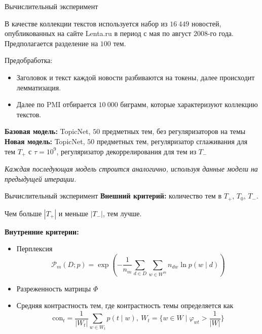 \documentclass{beamer}
\begin{document}
\begin{frame}{Вычислительный эксперимент}

В качестве коллекции текстов используется набор из $16 \ 449$ новостей, опубликованных на сайте Lenta.ru в период с мая по август $2008$-го года.
Предполагается разделение на $100$ тем. 

\begin{block}{Предобработка:}
\begin{itemize}
    \item Заголовок и текст каждой новости разбиваются на токены, далее происходит лемматизация.
    \item Далее по PMI отбирается $10 \ 000$ биграмм, которые характеризуют коллекцию текстов.
\end{itemize}
\end{block}

\textbf{Базовая модель:} TopicNet, $50$ предметных тем, без регуляризаторов на темы \\
\textbf{Новая модель:} TopicNet, $50$ предметных тем, регуляризатор сглаживания для тем $T_+$ с $\tau = {10}^{9}$, регуляризатор декоррелирования для тем из $T_-$

{\footnotesize \textit{Каждая последующая модель строится аналогично, используя данные модели на предыдущей итерации.}}

\end{frame}

\begin{frame}{Вычислительный эксперимент}
    \textbf{Внешний критерий:} количество тем в $T_+$, $T_0$, $T_-$.
    
    {\footnotesize Чем больше $|T_+|$ и меньше $|T_-|$, тем лучше.}

    \textbf{Внутренние критерии:}

    \begin{itemize}
        \item Перплексия
        $$\mathcal{P}_m (D; p) = \exp \left( - \frac{1}{n_m} \sum \limits_{d \in D} \sum \limits_{w \in W^m} n_{dw} \ln p (w \mid d) \right)$$
        \item Разреженность матрицы $\Phi$
        \item Средняя контрастность тем, где контрастность темы определяется как
        $$\text{con}_t = \frac{1}{|W_t|} \sum \limits_{w \in W_t} p(t \mid w), \ W_t = \{ w \in W \mid \varphi_{wt} > \frac{1}{|W|} \}$$
    \end{itemize}
\end{frame}
\end{document}
